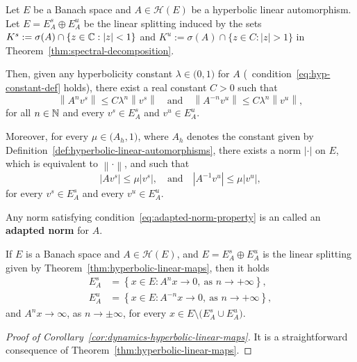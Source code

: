 \documentclass{article}
\newcommand{\abs}[1]{\left\lvert{#1}\right\rvert}
\newcommand{\norm}[1]{\left\|{#1}\right\|}
\newcommand{\mc}{\mathcal} \newcommand{\ms}{\mathscr}
\begin{document}
\begin{theorem}\label{thm:hyperbolic-linear-maps}
  Let $E$ be a Banach space and $A\in\mc{H}(E)$ be a hyperbolic linear automorphism. Let $E=E^{s}_{A}\oplus E^{u}_{A}$ be the linear splitting induced by the sets $K^{s}:=\sigma(A)\cap\{z\in\C : \abs{z}<1\}$ and $K^{u}:=\sigma(A)\cap\{z\in C : \abs{z}>1\}$ in Theorem~\ref{thm:spectral-decomposition}.

  Then, given any hyperbolicity constant $\lambda\in\big(0,1\big)$ for $A$ (\ie~condition~\eqref{eq:hyp-constant-def} holds), there exist a real constant $C>0$ such that
  \begin{displaymath}
    \norm{A^{n}v^{s}}\leq C\lambda^{n}\norm{v^{s}}\quad\text{and}\quad \norm{A^{-n}v^{u}}\leq C\lambda^{n}\norm{v^{u}},
  \end{displaymath}
  for all $n\in\mathbb{N}$ and every $v^{s}\in E^{s}_{A}$ and $v^{u}\in E^{u}_{A}$.

  Moreover, for every $\mu\in \big(A_h,1\big)$, where $A_h$ denotes the constant given by Definition~\ref{def:hyperbolic-linear-automorphisms}, there exists a norm $\abs{\cdot}$ on $E$, which is equivalent to $\norm{\cdot}$, and such that
  \begin{equation}\label{eq:adapted-norm-property}
    \abs{Av^{s}}\leq\mu\abs{v^{s}},\quad\text{and}\quad\abs{A^{-1}v^{u}}\leq\mu\abs{v^{u}},
  \end{equation}
  for every $v^{s}\in E^{s}_{A}$ and every $v^{u}\in E^{u}_{A}$.

  Any norm satisfying condition~\eqref{eq:adapted-norm-property} is an called an \textbf{adapted norm} for $A$.
\end{theorem}

\begin{corollary}\label{cor:dynamics-hyperbolic-linear-maps}
  If $E$ is a Banach space and $A\in\mc{H}(E)$, and $E=E^{s}_{A}\oplus E^{u}_{A}$ is the linear splitting given by Theorem~\ref{thm:hyperbolic-linear-maps}, then it holds
  \begin{align*}
    E^{s}_{A}&=\left\{x\in E : A^{n}x\to 0,\ \text{as } n\to+\infty\right\},\\
    E^{u}_{A}&=\left\{x\in E : A^{-n}x\to 0,\ \text{as } n\to+\infty\right\},
  \end{align*}
  and $A^{n}x\to\infty$, as $n\to\pm\infty$, for every $x\in E\setminus\big(E_{A}^{s}\cup E_{A}^{u})$.
\end{corollary}

\begin{proof}[Proof of Corollary~\ref{cor:dynamics-hyperbolic-linear-maps}]
  It is a straightforward consequence of Theorem~\ref{thm:hyperbolic-linear-maps}.
\end{proof}
\end{document}
